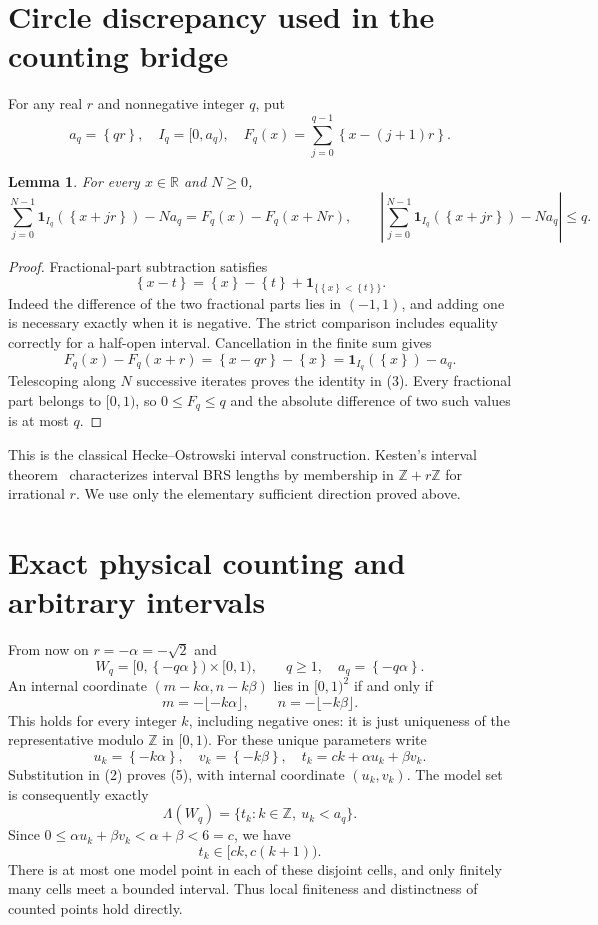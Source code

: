 \documentclass[11pt]{article}
\newtheorem{lemma}[theorem]{Lemma}
\newcommand{\fr}[1]{\left\{#1\right\}}
\newcommand{\R}{\mathbb R}
\newcommand{\Z}{\mathbb Z}
\begin{document}
\section{Circle discrepancy used in the counting bridge}
For any real $r$ and nonnegative integer $q$, put
\[
 a_q=\fr{qr},\quad I_q=[0,a_q),\quad
 F_q(x)=\sum_{j=0}^{q-1}\fr{x-(j+1)r}.
\]
\begin{lemma}\label{lem:circle}
For every $x\in\R$ and $N\ge0$,
\[
 \sum_{j=0}^{N-1}\mathbf1_{I_q}(\fr{x+jr})-Na_q
 =F_q(x)-F_q(x+Nr),\qquad
 \left|\sum_{j=0}^{N-1}\mathbf1_{I_q}(\fr{x+jr})-Na_q\right|\le q.
                                                        \tag{3}
\]
\end{lemma}
\begin{proof}
Fractional-part subtraction satisfies
\[
 \fr{x-t}=\fr{x}-\fr{t}+\mathbf1_{\{\fr{x}<\fr{t}\}}.
\]
Indeed the difference of the two fractional parts lies in $(-1,1)$,
and adding one is necessary exactly when it is negative. The strict
comparison includes equality correctly for a half-open interval.
Cancellation in the finite sum gives
\[
 F_q(x)-F_q(x+r)=\fr{x-qr}-\fr{x}
                   =\mathbf1_{I_q}(\fr{x})-a_q.
\]
Telescoping along $N$ successive iterates proves the identity in (3).
Every fractional part belongs to $[0,1)$, so $0\le F_q\le q$ and the
absolute difference of two such values is at most $q$.
\end{proof}
This is the classical Hecke--Ostrowski interval construction. Kesten's
interval theorem~\cite{Kesten} characterizes interval BRS lengths by
membership in $\Z+r\Z$ for irrational $r$. We use only the elementary
sufficient direction proved above.

\section{Exact physical counting and arbitrary intervals}
From now on $r=-\alpha=-\sqrt2$ and
\[
 W_q=[0,\fr{-q\alpha})\times[0,1),\qquad q\ge1,
 \quad a_q=\fr{-q\alpha}.
\]
An internal coordinate $(m-k\alpha,n-k\beta)$ lies in $[0,1)^2$ if
and only if
\[
 m=-\lfloor-k\alpha\rfloor,\qquad n=-\lfloor-k\beta\rfloor.
                                                        \tag{4}
\]
This holds for every integer $k$, including negative ones: it is just
uniqueness of the representative modulo $\Z$ in $[0,1)$.
For these unique parameters write
\[
 u_k=\fr{-k\alpha},\quad v_k=\fr{-k\beta},\quad
 t_k=ck+\alpha u_k+\beta v_k.
                                                        \tag{5}
\]
Substitution in (2) proves (5), with internal coordinate $(u_k,v_k)$.
The model set is consequently exactly
\[
 \Lambda(W_q)=\{t_k:k\in\Z,\ u_k<a_q\}.           \tag{6}
\]
Since $0\le\alpha u_k+\beta v_k<\alpha+\beta<6=c$, we have
\[
 t_k\in[ck,c(k+1)).                               \tag{7}
\]
There is at most one model point in each of these disjoint cells, and
only finitely many cells meet a bounded interval. Thus local finiteness
and distinctness of counted points hold directly.
\end{document}

